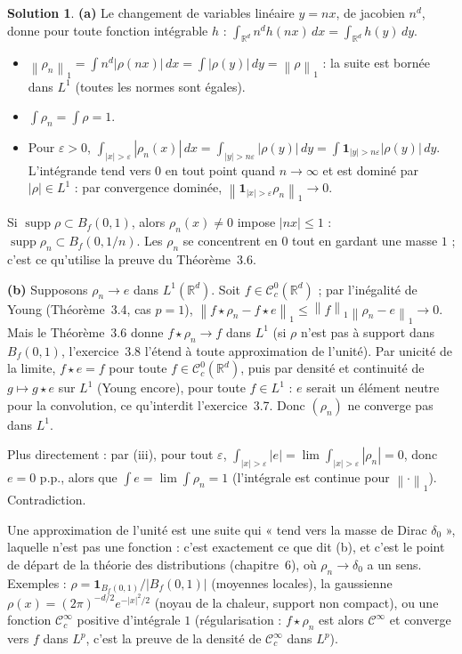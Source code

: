 \documentclass[11pt,a4paper]{article}
\newcommand{\R}{\mathbb{R}}
\newcommand{\Bf}{B_f}
\newcommand{\norm}[1]{\left\|#1\right\|}
\newcommand{\Cc}{\mathcal{C}^0_c}
\DeclareMathOperator{\supp}{supp}
\theoremstyle{definition}
\newtheorem*{solution}{Solution}
\begin{document}
\begin{solution}
\noindent\textbf{(a)} Le changement de variables linéaire $y=nx$, de jacobien $n^d$, donne pour toute fonction intégrable $h$ : $\int_{\R^d}n^dh(nx)\,dx=\int_{\R^d}h(y)\,dy$.
\begin{itemize}
  \item[(i)] $\norm{\rho_n}_1=\int n^d|\rho(nx)|\,dx=\int|\rho(y)|\,dy=\norm\rho_1$ : la suite est bornée dans $L^1$ (toutes les normes sont égales).
  \item[(ii)] $\int\rho_n=\int\rho=1$.
  \item[(iii)] Pour $\varepsilon>0$, $\int_{|x|>\varepsilon}|\rho_n(x)|\,dx=\int_{|y|>n\varepsilon}|\rho(y)|\,dy=\int\mathbf 1_{|y|>n\varepsilon}|\rho(y)|\,dy$. L'intégrande tend vers $0$ en tout point quand $n\to\infty$ et est dominé par $|\rho|\in L^1$ : par convergence dominée, $\norm{\mathbf 1_{|x|>\varepsilon}\rho_n}_1\to0$.
\end{itemize}
Si $\supp\rho\subset\Bf(0,1)$, alors $\rho_n(x)\ne0$ impose $|nx|\le1$ : $\supp\rho_n\subset\Bf(0,1/n)$. Les $\rho_n$ se concentrent en $0$ tout en gardant une masse $1$ ; c'est ce qu'utilise la preuve du Théorème~3.6.

\medskip
\noindent\textbf{(b)} Supposons $\rho_n\to e$ dans $L^1(\R^d)$. Soit $f\in\Cc(\R^d)$ ; par l'inégalité de Young (Théorème~3.4, cas $p=1$), $\norm{f\star\rho_n-f\star e}_1\le\norm f_1\norm{\rho_n-e}_1\to0$. Mais le Théorème~3.6 donne $f\star\rho_n\to f$ dans $L^1$ (si $\rho$ n'est pas à support dans $\Bf(0,1)$, l'exercice~3.8 l'étend à toute approximation de l'unité). Par unicité de la limite, $f\star e=f$ pour toute $f\in\Cc(\R^d)$, puis par densité et continuité de $g\mapsto g\star e$ sur $L^1$ (Young encore), pour toute $f\in L^1$ : $e$ serait un élément neutre pour la convolution, ce qu'interdit l'exercice~3.7. Donc $(\rho_n)$ ne converge pas dans $L^1$.

Plus directement : par (iii), pour tout $\varepsilon$, $\int_{|x|>\varepsilon}|e|=\lim\int_{|x|>\varepsilon}|\rho_n|=0$, donc $e=0$ p.p., alors que $\int e=\lim\int\rho_n=1$ (l'intégrale est continue pour $\norm\cdot_1$). Contradiction.
\end{solution}

\begin{commentaire}
Une approximation de l'unité est une suite qui « tend vers la masse de Dirac $\delta_0$ », laquelle n'est pas une fonction : c'est exactement ce que dit (b), et c'est le point de départ de la théorie des distributions (chapitre~6), où $\rho_n\to\delta_0$ a un sens. Exemples : $\rho=\mathbf 1_{\Bf(0,1)}/|\Bf(0,1)|$ (moyennes locales), la gaussienne $\rho(x)=(2\pi)^{-d/2}e^{-|x|^2/2}$ (noyau de la chaleur, support non compact), ou une fonction $\mathcal C^\infty_c$ positive d'intégrale $1$ (régularisation : $f\star\rho_n$ est alors $\mathcal C^\infty$ et converge vers $f$ dans $L^p$, c'est la preuve de la densité de $\mathcal C^\infty_c$ dans $L^p$).
\end{commentaire}
\end{document}
